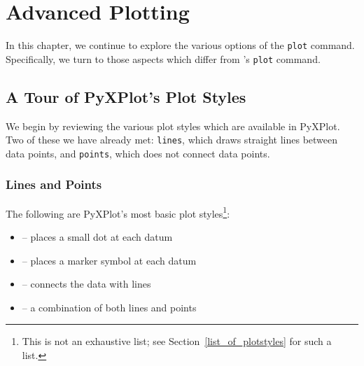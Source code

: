 %
%
%
%
%



\chapter{Advanced Plotting}

In this chapter, we continue to explore the various options of the {\tt plot}
command. Specifically, we turn to those aspects which differ from \gnuplot's
{\tt plot} command.

\section{A Tour of PyXPlot's Plot Styles}

We begin by reviewing the various plot styles which are available in PyXPlot.
Two of these we have already met: {\tt lines}, which draws straight lines
between data points, and {\tt points}, which does not connect data points.

\subsection{Lines and Points}

The following are PyXPlot's most basic plot styles\footnote{This is not an
exhaustive list; see Section~\ref{list_of_plotstyles} for such a list.}:
\begin{itemize}
\item {} -- places a small dot at each datum
\item {} -- places a marker symbol at each datum
\item {} -- connects the data with lines
\item {} -- a combination of both lines and points
\end{itemize}

